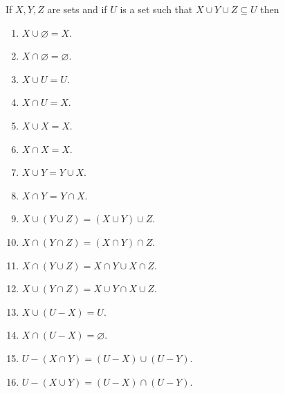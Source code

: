 \begin{prop}\label{c2s1p1}
If $X, Y, Z$ are sets and if $U$ is a set such that $X \cup Y \cup Z 
\subseteq U$ then
\begin{enumerate}
\item $X \cup \varnothing = X$.
\item $X \cap \varnothing = \varnothing$.
\item $X \cup U = U$.
\item $X \cap U = X$.
\item $X \cup X = X$.
\item $X \cap X = X$.
\item $X \cup Y = Y \cup X$.
\item $X \cap Y$ = $Y \cap X$.
\item $X \cup (Y \cup Z) = (X \cup Y) \cup Z$.
\item $X \cap (Y \cap Z) = (X \cap Y) \cap Z$.
\item $X \cap (Y \cup Z) = X \cap Y \cup X \cap Z$.
\item $X \cup (Y \cap Z) = X \cup Y \cap X \cup Z$.
\item $X \cup (U - X) = U$.
\item $X \cap (U - X) = \varnothing$.
\item $U - (X \cap Y) = (U - X) \cup (U - Y)$.
\item $U - (X \cup Y) = (U - X) \cap (U - Y)$.
\end{enumerate}
\end{prop}
